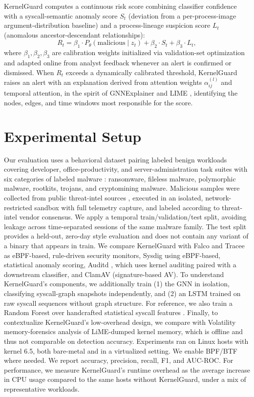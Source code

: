 \documentclass[conference]{IEEEtran}
\begin{document}
KernelGuard computes a continuous risk score combining classifier confidence with a syscall-semantic anomaly score $S_t$ (deviation from a per-process-image argument-distribution baseline) and a process-lineage suspicion score $L_t$ (anomalous ancestor-descendant relationships):
\begin{equation}
R_t = \beta_1 \cdot P_{\theta}(\text{malicious} \mid z_t) + \beta_2 \cdot S_t + \beta_3 \cdot L_t,
\end{equation}
where $\beta_1,\beta_2,\beta_3$ are calibration weights initialized via validation-set optimization and adapted online from analyst feedback whenever an alert is confirmed or dismissed. When $R_t$ exceeds a dynamically calibrated threshold, KernelGuard raises an alert with an explanation derived from attention weights $\alpha_{ij}^{(l)}$ and temporal attention, in the spirit of GNNExplainer \cite{ying2019gnnexplainer} and LIME \cite{ribeiro2016lime}, identifying the nodes, edges, and time windows most responsible for the score.

\section{Experimental Setup}
Our evaluation uses a behavioral dataset pairing labeled benign workloads covering developer, office-productivity, and server-administration task suites with six categories of labeled malware : ransomware, fileless malware, polymorphic malware, rootkits, trojans, and cryptomining malware. Malicious samples were collected from public threat-intel sources \cite{or2019dynamic,rieck2011automatic}, executed in an isolated, network-restricted sandbox with full telemetry capture, and labeled according to threat-intel vendor consensus. We apply a temporal train/validation/test split, avoiding leakage across time-separated sessions of the same malware family. The test split provides a held-out, zero-day style evaluation and does not contain any variant of a binary that appears in train. We compare KernelGuard with Falco and Tracee \cite{falco2020,tracee2021} as eBPF-based, rule-driven security monitors, Sysdig \cite{sysdig2021} using eBPF-based, statistical anomaly scoring, Auditd \cite{auditd2018}, which uses kernel auditing paired with a downstream classifier, and ClamAV \cite{clamav2020} (signature-based AV). To understand KernelGuard's components, we additionally train (1) the GNN in isolation, classifying syscall-graph snapshots independently, and (2) an LSTM trained on raw syscall sequences \cite{kolosnjaji2016deep} without graph structure. For reference, we also train a Random Forest over handcrafted statistical syscall features \cite{ucci2019survey}. Finally, to contextualize KernelGuard's low-overhead design, we compare with Volatility memory-forensics analysis of LiME-dumped kernel memory, which is offline and thus not comparable on detection accuracy. Experiments ran on Linux hosts with kernel 6.5, both bare-metal and in a virtualized setting. We enable BPF/BTF where needed. We report accuracy, precision, recall, F1, and AUC-ROC. For performance, we measure KernelGuard's runtime overhead as the average increase in CPU usage compared to the same hosts without KernelGuard, under a mix of representative workloads.
\end{document}
